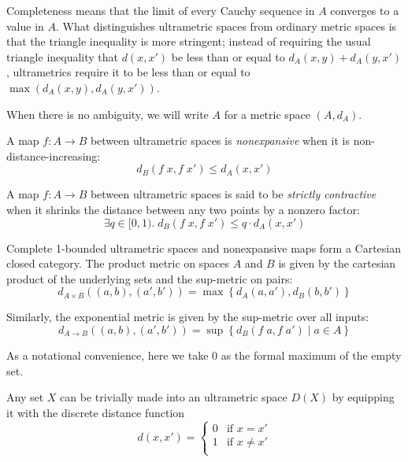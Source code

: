 \documentclass[preprint]{sigplanconf}
\newcommand{\setof}[1]{\left\{{#1}\right\}}
\newcommand{\comprehend}[2]{\setof{{#1}\;|\;{#2}}}
\begin{document}
Completeness means that the limit of every Cauchy sequence in $A$
converges to a value in $A$. What distinguishes ultrametric spaces
from ordinary metric spaces is that the triangle inequality is more
stringent; instead of requiring the usual triangle inequality that
$d(x,x')$ be less than or equal to $d_A(x, y) + d_A(y, x')$,
ultrametrics require it to be less than or equal to $\max(d_A(x, y),
d_A(y, x'))$.

When there is no ambiguity, we will write $A$ for a metric space $(A, d_A)$. 

A map $f : A \to B$ between ultrametric spaces is \emph{nonexpansive} when 
it is non-distance-increasing:
\begin{displaymath}
  d_B(f\;x, f\;x') \leq d_A(x, x')
\end{displaymath}

A map $f : A \to B$ between ultrametric spaces is said to be
\emph{strictly contractive} when it shrinks the distance between 
any two points by a nonzero factor:
\begin{displaymath}
  \exists q \in [0,1).\; d_B(f\;x, f\;x') \leq q \cdot d_A(x, x')
\end{displaymath}

Complete 1-bounded ultrametric spaces and nonexpansive maps form a 
Cartesian closed category. The product metric on spaces $A$ and $B$
is given by the cartesian product of the underlying sets and the sup-metric
on pairs:
\begin{displaymath}
  d_{A \times B}((a,b), (a',b')) = \max \setof{d_A(a,a'), d_B(b,b')}
\end{displaymath}

Similarly, the exponential metric is given by the sup-metric over all
inputs:
\begin{displaymath}
  d_{A \to B}((a,b), (a',b')) = \sup \comprehend{d_B(f\;a,f\;a')}{a \in A}
\end{displaymath}

As a notational convenience, here we take $0$ as the formal
maximum of the empty set.

Any set $X$ can be trivially made into an ultrametric space $D(X)$ by
equipping it with the discrete distance function
\begin{displaymath}
d(x,x') = \left\{\begin{array}{ll}
                  0 & \mbox{if } x = x' \\
                  1 & \mbox{if } x \not= x' \\
                \end{array}
          \right.
\end{displaymath}
\end{document}
